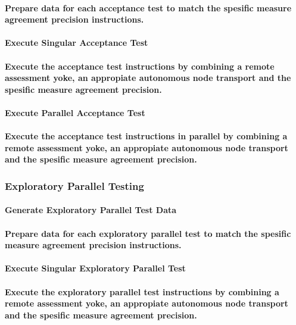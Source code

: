 \documentclass{acm_proc_article-sp}
\begin{document}
\paragraph{Prepare data for each acceptance test to match the spesific measure agreement precision instructions.}
\paragraph{Execute Singular Acceptance Test}
\paragraph{Execute the acceptance test instructions by combining a remote assessment yoke, an appropiate autonomous node transport and the spesific measure agreement precision.}
\paragraph{Execute Parallel Acceptance Test}
\paragraph{Execute the acceptance test instructions in parallel by combining a remote assessment yoke, an appropiate autonomous node transport and the spesific measure agreement precision.}
\subsubsection{Exploratory Parallel Testing}
\paragraph{Generate Exploratory Parallel Test Data}
\paragraph{Prepare data for each exploratory parallel test to match the spesific measure agreement precision instructions.}
\paragraph{Execute Singular Exploratory Parallel Test}
\paragraph{Execute the exploratory parallel test instructions by combining a remote assessment yoke, an appropiate autonomous node transport and the spesific measure agreement precision.}
\end{document}
